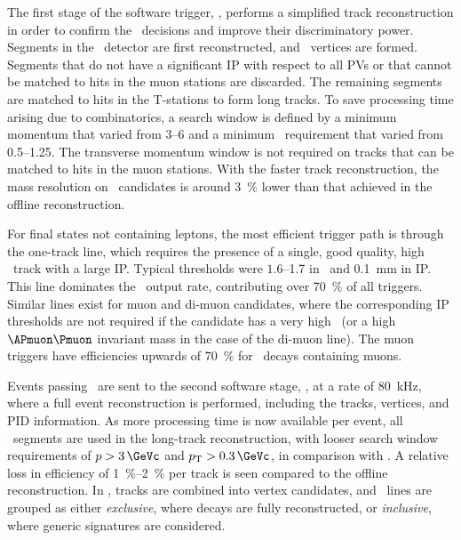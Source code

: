 The first stage of the software trigger, \hltone, performs a simplified track 
reconstruction in order to confirm the \lzero\ decisions and improve their 
discriminatory power.
Segments in the \velo\ detector are first reconstructed, and \pp\ vertices are 
formed.
Segments that do not have a significant \ac{IP} with respect to all \acp{PV} or 
that cannot be matched to hits in the muon stations are discarded.
The remaining segments are matched to hits in the T-stations to form long 
tracks.
To save processing time arising due to combinatorics, a search window is 
defined by a minimum momentum that varied from \SIrange{3}{6}{\GeVc} and a 
minimum \pT\ requirement that varied from \SIrange{0.5}{1.25}{\GeVc}.
The transverse momentum window is not required on tracks that can be matched to 
hits in the muon stations.
With the faster track reconstruction, the mass resolution on \JpsiTomumu\ 
candidates is around \SI{3}{\percent} lower than that achieved in the offline 
reconstruction.

For final states not containing leptons, the most efficient trigger path is 
through the one-track line, which requires the presence of a single, good 
quality, high \pT\ track with a large \ac{IP}.
Typical thresholds were $1.6$--\SI{1.7}{\GeVc} in \pT\ and 
\SI{0.1}{\milli\metre} in \ac{IP}.
This line dominates the \hltone\ output rate, contributing over 
\SI{70}{\percent} of all triggers.
Similar lines exist for muon and di-muon candidates, where the corresponding 
\ac{IP} thresholds are not required if the candidate has a very high \pT\ (or a 
high $\APmuon\Pmuon$ invariant mass in the case of the di-muon line).
The muon triggers have efficiencies upwards of \SI{70}{\percent} for \PB\ 
decays containing muons.

Events passing \hltone\ are sent to the second software stage, \hlttwo, at a 
rate of \SI{80}{\kilo\hertz}, where a full event reconstruction is performed, 
including the tracks, vertices, and \ac{PID} information.
As more processing time is now available per event, all \velo\ segments are 
used in the long-track reconstruction, with looser search window requirements 
of $\ptot > \SI{3}{\GeVc}$ and $\pT > \SI{0.3}{\GeVc}$, in comparison with 
\hltone.
A relative loss in efficiency of \SIrange{1}{2}{\percent} per track is seen 
compared to the offline reconstruction.
In \hlttwo, tracks are combined into vertex candidates, and \hlttwo\ lines are 
grouped as either \emph{exclusive}, where decays are fully reconstructed, or 
\emph{inclusive}, where generic signatures are considered.

